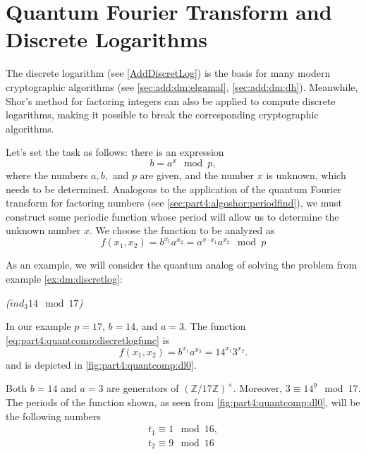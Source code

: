 \section{Quantum Fourier Transform and Discrete Logarithms}

The discrete logarithm (see \autoref{AddDiscretLog}) is the basis for many modern cryptographic algorithms (see \autoref{sec:add:dm:elgamal}, \autoref{sec:add:dm:dh}). Meanwhile, Shor's method for factoring integers can also be applied to compute discrete logarithms, making it possible to break the corresponding cryptographic algorithms.

Let's set the task as follows: there is an expression 
\[
b = a^x \mod p,
\]
where the numbers $a, b,$ and $p$ are given, and the number $x$ is unknown, which needs to be determined. Analogous to the application of the quantum Fourier transform for factoring numbers (see \autoref{sec:part4:algoshor:periodfind}), we must construct some periodic function whose period will allow us to determine the unknown number $x$. We choose the function to be analyzed as
\begin{equation}
f\left(x_1, x_2\right) = b^{x_1}a^{x_2} = a^{x \cdot x_1} a^{x_2} \mod p
\label{eq:part4:quantcomp:discretlogfunc}
\end{equation}

As an example, we will consider the quantum analog of solving the problem from example \ref{ex:dm:discretlog}:
\begin{example}
\emph{($ind_3{14} \mod{17}$)}

In our example $p = 17$, $b=14$, and $a=3$. The function \eqref{eq:part4:quantcomp:discretlogfunc} is
\[
f\left(x_1, x_2\right) = b^{x_1}a^{x_2} = 14^{x_1}3^{x_2}.
\]
and is depicted in \autoref{fig:part4:quantcomp:dl0}.

Both $b=14$ and $a=3$ are generators of $\left(\mathbb{Z}/17\mathbb{Z}\right)^\times$. Moreover, $3 \equiv 14^9 \mod 17$. The periods of the function shown, as seen from \autoref{fig:part4:quantcomp:dl0}, will be the following numbers 
\begin{eqnarray}
t_1 \equiv 1 \mod 16,
\nonumber \\
t_2 \equiv 9 \mod 16
\end{eqnarray} 
\label{ex:part4:quantcomp:discretlog:periodfinding0}
\end{example}


